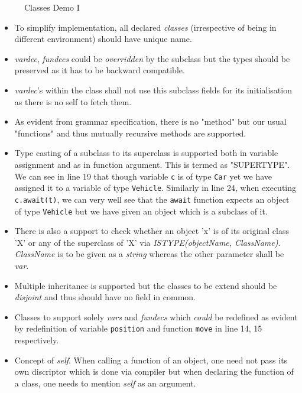 \begin{figure}
\centering
{}
\caption{Classes Demo I}
\label{fig:wmi}
\end{figure}

\begin{itemize}
  \item To simplify implementation, all declared \textit{classes} (irrespective of being in different environment) should have unique name.
  \item \textit{vardec}, \textit{fundecs} could be \textit{overridden} by the subclass but the types should be preserved as it has to be backward compatible.
  \item \textit{vardec}'s within the class shall not use this subclass fields for its initialisation as there is no self to fetch them.
  \item As evident from grammar specification, there is no "method" but our usual "functions" and thus mutually recursive methods are supported.
  \item Type casting of a subclass to its superclass is supported both in variable assignment and as in function argument. This is termed as "SUPERTYPE". We can see in line 19 that though variable \texttt{c} is of type \texttt{Car} yet we have assigned it to a variable of type \texttt{Vehicle}. Similarly in line 24, when executing \texttt{c.await(t)}, we can very well see that the \texttt{await} function expects an object of type \texttt{Vehicle} but we have given an object which is a subclass of it.
  \item There is also a support to check whether an object 'x' is of its original class 'X' or any of the superclass of 'X' via \textit{ISTYPE(objectName, ClassName)}. \textit{ClassName} is to be given as a \textit{string} whereas the other parameter shall be \textit{var}.
  \item Multiple inheritance is supported but the classes to be extend should be \textit{disjoint} and thus should have no field in common. 
  \item Classes to support solely \textit{vars} and \textit{fundecs} which \textit{could} be redefined as evident by redefinition of variable \texttt{position} and function \texttt{move} in line 14, 15 respectively.
  \item Concept of \textit{self}. When calling a function of an object, one need not pass its own discriptor which is done via compiler but when declaring the function of a class, one needs to mention \textit{self} as an argument.
\end{itemize}


